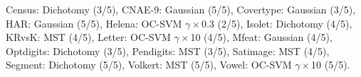 Census: Dichotomy (3/5), CNAE-9: Gaussian (5/5), Covertype: Gaussian (3/5), HAR: Gaussian (5/5), Helena: OC-SVM $\gamma{\times}$0.3 (2/5), Isolet: Dichotomy (4/5), KRvsK: MST (4/5), Letter: OC-SVM $\gamma{\times}$10 (4/5), Mfeat: Gaussian (4/5), Optdigits: Dichotomy (3/5), Pendigits: MST (3/5), Satimage: MST (4/5), Segment: Dichotomy (5/5), Volkert: MST (5/5), Vowel: OC-SVM $\gamma{\times}$10 (5/5).
